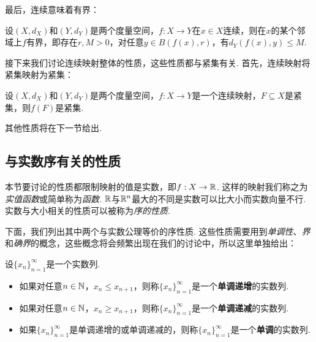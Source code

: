 最后，连续意味着有界：
\begin{proposition}\label{proposition:continuous-bounded}
    设$(X,d_X)$和$(Y,d_Y)$是两个度量空间，$f:X\to Y$在$x\in X$连续，则在$x$的某个邻域上$f$有界，即存在$r,M>0$，对任意$y\in B(f(x),r)$，有$d_Y(f(x),y)\leq M$. 
\end{proposition}

接下来我们讨论连续映射整体的性质，这些性质都与紧集有关. 首先，连续映射将紧集映射为紧集：

\begin{proposition}\label{proposition:continuous-compact}
    设$(X,d_X)$和$(Y,d_Y)$是两个度量空间，$f:X\to Y$是一个连续映射，$F\subseteq X$是紧集，则$f(F)$是紧集. 
\end{proposition}

其他性质将在下一节给出. 

\subsection{与实数序有关的性质}

本节要讨论的性质都限制映射的值是实数，即$f:X\to \mathbb{R}$. 这样的映射我们称之为\textit{实值函数}或简单称为\textit{函数}. $\mathbb{R}$与$\mathbb{R}^n$最大的不同是实数可以比大小而实数向量不行. 实数与大小相关的性质可以被称为\textit{序的性质}. 

下面，我们列出其中两个与实数公理等价的序性质. 这些性质需要用到\textit{单调性}、\textit{界}和\textit{确界}的概念，这些概念将会频繁出现在我们的讨论中，所以这里单独给出：

\begin{definition}[单调性]
    设$\{x_n\}_{n=1}^\infty$是一个实数列. 
\begin{itemize}
    \item 如果对任意$n\in\mathbb{N}$，$x_n\leq x_{n+1}$，则称$\{x_n\}_{n=1}^\infty$是一个\textbf{单调递增}的实数列. 
    \item 如果对任意$n\in\mathbb{N}$，$x_n\geq x_{n+1}$，则称$\{x_n\}_{n=1}^\infty$是一个\textbf{单调递减}的实数列. 
    \item 如果$\{x_n\}_{n=1}^\infty$是单调递增的或单调递减的，则称$\{x_n\}_{n=1}^\infty$是一个\textbf{单调}的实数列. 
\end{itemize}
\end{definition}

